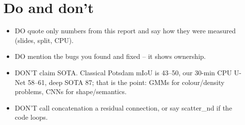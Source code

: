 \section{Do and don't}
\begin{itemize}
\item DO quote only numbers from this report and say how they were measured (slides, split, CPU).
\item DO mention the bugs you found and fixed -- it shows ownership.
\item DON'T claim SOTA. Classical Potsdam mIoU is 43--50, our 30-min CPU U-Net 58--61, deep SOTA 87; that is the point: GMMs for colour/density
problems, CNNs for shape/semantics.
\item DON'T call concatenation a residual connection, or say scatter\_nd if the code loops.
\end{itemize}

